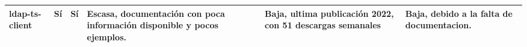 \begin{landscape}
\begin{longtable}{|l|p{3cm}|p{2.5cm}|p{6cm}|p{5cm}|p{6cm}|}
        \hline
        ldap-ts-client        & Sí                             & Sí                          & Escasa, documentación con poca información disponible y pocos ejemplos.                                                                    & Baja, ultima publicación 2022, con 51 descargas semanales                             & Baja, debido a la falta de documentacion.                                                                              \\
        \hline
    \end{longtable}
\end{landscape}
\restoregeometry